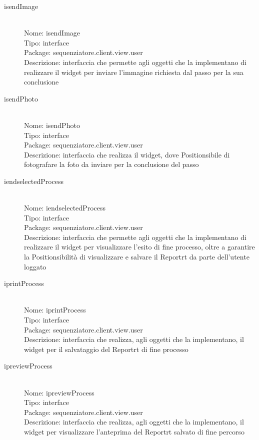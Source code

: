 \begin{description}
	\item[isendImage] 
  	\hfill \\
  	Nome: isendImage\\
  	Tipo: interface\\
	Package: sequenziatore.client.view.user\\
	Descrizione: interfaccia che permette agli oggetti che la implementano di realizzare il widget per inviare l'immagine richiesta dal passo per la sua conclusione
\end{description}

\begin{description}
	\item[isendPhoto] 
  	\hfill \\
  	Nome: isendPhoto\\
  	Tipo: interface\\
	Package: sequenziatore.client.view.user\\
	Descrizione: interfaccia che realizza il widget, dove Positionsibile di fotografare la foto da inviare per la conclusione del passo
\end{description}

\begin{description}
	\item[iendselectedProcess] 
  	\hfill \\
  	Nome: iendselectedProcess\\
  	Tipo: interface\\
	Package: sequenziatore.client.view.user\\
	Descrizione: interfaccia che permette agli oggetti che la implementano di realizzare il widget per visualizzare l'esito di fine processo, oltre a garantire la Positionsibilità di visualizzare e salvare il Reportrt da parte dell'utente loggato
\end{description}

\begin{description}
	\item[iprintProcess] 
  	\hfill \\
  	Nome: iprintProcess\\
  	Tipo: interface\\
	Package: sequenziatore.client.view.user\\
	Descrizione: interfaccia che realizza, agli oggetti che la implementano,  il widget per il salvataggio del Reportrt di fine processo
\end{description}

\begin{description}
	\item[ipreviewProcess] 
  	\hfill \\
  	Nome: ipreviewProcess\\
  	Tipo: interface\\
	Package: sequenziatore.client.view.user\\
	Descrizione: interfaccia che realizza, agli oggetti che la implementano,  il widget per visualizzare l'anteprima del Reportrt salvato di fine percorso
\end{description}
